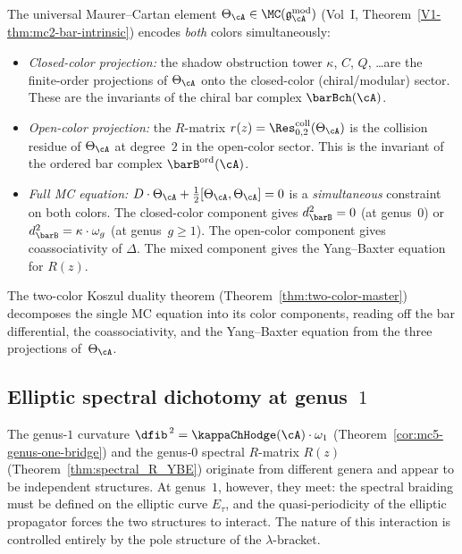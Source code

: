 \begin{remark}
\label{rem:theta-two-colors}
The universal Maurer--Cartan element
$\Theta_\cA \in \MC(\mathfrak{g}_\cA^{\mathrm{mod}})$
(Vol~I, Theorem~\ref*{V1-thm:mc2-bar-intrinsic}) encodes
\emph{both} colors simultaneously:
\begin{itemize}
\item \emph{Closed-color projection:} the shadow obstruction
 tower $\kappa$, $C$, $Q$, \ldots are the finite-order
 projections of $\Theta_\cA$ onto the closed-color
 (chiral/modular) sector. These are the invariants of the
 chiral bar complex $\barBch(\cA)$.
\item \emph{Open-color projection:} the $R$-matrix
 $r(z) = \Res^{\mathrm{coll}}_{0,2}(\Theta_\cA)$
 is the collision residue of $\Theta_\cA$ at degree~$2$
 in the open-color sector. This is the invariant of the
 ordered bar complex $\barB^{\mathrm{ord}}(\cA)$.
\item \emph{Full MC equation:} $D \cdot \Theta_\cA
 + \tfrac{1}{2}[\Theta_\cA, \Theta_\cA] = 0$
 is a \emph{simultaneous} constraint on both colors. The
 closed-color component gives $d_{\barB}^2 = 0$ (at
 genus~$0$) or $d_{\barB}^2 = \kappa \cdot \omega_g$ (at
 genus~$g \ge 1$). The open-color component gives
 coassociativity of $\Delta$. The mixed component gives
 the Yang--Baxter equation for $R(z)$.
\end{itemize}
The two-color Koszul duality theorem
(Theorem~\ref{thm:two-color-master}) decomposes the single MC
equation into its color components, reading off the bar
differential, the coassociativity, and the Yang--Baxter equation
from the three projections of~$\Theta_\cA$.
\end{remark}



\subsection{Elliptic spectral dichotomy at genus~$1$}
\label{subsec:elliptic-spectral-dichotomy}

The genus-$1$ curvature $\dfib^{\,2} = \kappaChHodge(\cA)\cdot\omega_1$
(Theorem~\ref{cor:mc5-genus-one-bridge}) and the genus-$0$ spectral
$R$-matrix $R(z)$ (Theorem~\ref{thm:spectral_R_YBE}) originate from
different genera and appear to be independent structures. At genus~$1$,
however, they meet: the spectral braiding must be defined on the
elliptic curve $E_\tau$, and the quasi-periodicity of the elliptic
propagator forces the two structures to interact. The nature of this
interaction is controlled entirely by the pole structure of the
$\lambda$-bracket.

